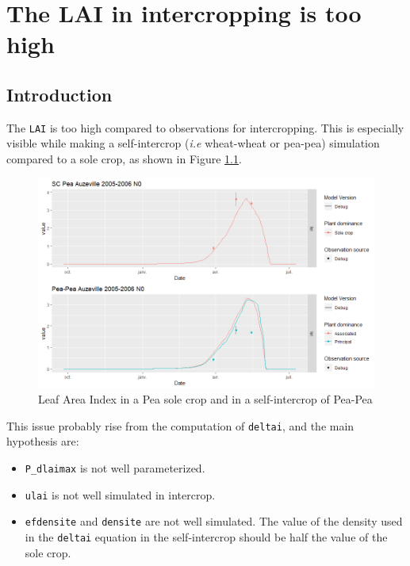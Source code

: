 \documentclass[]{book}
\providecommand{\tightlist}{%
  \setlength{\itemsep}{0pt}\setlength{\parskip}{0pt}}
\begin{document}
\hypertarget{LAItoohigh}{%
\chapter{The LAI in intercropping is too high}\label{LAItoohigh}}

\hypertarget{introduction-9}{%
\section{Introduction}\label{introduction-9}}

The \texttt{LAI} is too high compared to observations for intercropping. This is especially visible while making a self-intercrop (\emph{i.e} wheat-wheat or pea-pea) simulation compared to a sole crop, as shown in Figure \ref{fig:LAItoohigh}.

\begin{figure}
\centering
\includegraphics{img/LAI_high_PP.png}
\caption{\label{fig:LAItoohigh}Leaf Area Index in a Pea sole crop and in a self-intercrop of Pea-Pea}
\end{figure}

This issue probably rise from the computation of \texttt{deltai}, and the main hypothesis are:

\begin{itemize}
\tightlist
\item
  \texttt{P\_dlaimax} is not well parameterized.\\
\item
  \texttt{ulai} is not well simulated in intercrop.\\
\item
  \texttt{efdensite} and \texttt{densite} are not well simulated. The value of the density used in the \texttt{deltai} equation in the self-intercrop should be half the value of the sole crop.
\end{itemize}
\end{document}
